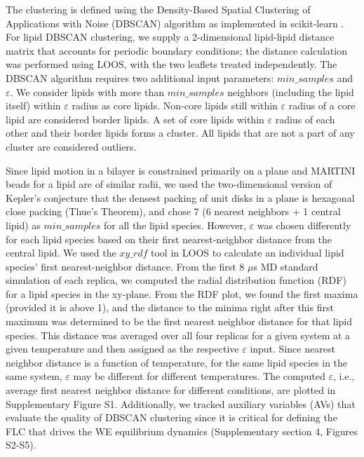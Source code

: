 \documentclass{biophys-new}
\begin{document}
The clustering is defined using the Density-Based Spatial Clustering of Applications with Noise (DBSCAN) algorithm \cite{MartinEsterHans-PeterKriegelJiirgSander1996, Ester2017} as implemented in scikit-learn \cite{PedregosaF.VaroquauxG.GramfortA.MichelV.ThirionB.GriselO.BlondelM.PrettenhoferP.WeissR.andDubourgV.VanderplasJ.PassosA.CournapeauD.BrucherM.PerrotM.Duchesnay2011}.
For lipid DBSCAN clustering, we supply a 2-dimensional lipid-lipid distance matrix that accounts for periodic boundary conditions; the distance calculation was performed using LOOS, with the two leaflets treated independently.
The DBSCAN algorithm requires two additional input parameters: $min\_samples$ and $\varepsilon$.
We consider lipids with more than $min\_samples$ neighbors (including the lipid itself) within $\varepsilon$ radius as core lipids.
Non-core lipids still within $\varepsilon$ radius of a core lipid are considered border lipids.
A set of core lipids within $\varepsilon$ radius of each other and their border lipids forms a cluster.
All lipids that are not a part of any cluster are considered outliers.

Since lipid motion in a bilayer is constrained primarily on a plane and MARTINI beads for a lipid are of similar radii, we used the two-dimensional version of Kepler's conjecture that the densest packing of unit disks in a plane is hexagonal close packing (Thue's Theorem), and
chose 7 (6 nearest neighbors + 1 central lipid) as $min\_samples$ for all the lipid species.
However, $\varepsilon$ was chosen differently for each lipid species based on their first nearest-neighbor distance from the central lipid.
We used the $xy\_rdf$ tool in LOOS to calculate an individual lipid species' first nearest-neighbor distance.
From the first 8 $\mu$s MD standard simulation of each replica, we computed the radial distribution function (RDF) for a lipid species in the xy-plane.
From the RDF plot, we found the first maxima (provided it is above 1), and the distance to the minima right after this first maximum was determined to be the first nearest neighbor distance for that lipid species.
This distance was averaged over all four replicas for a given system at a given temperature and then assigned as the respective $\varepsilon$ input.
Since nearest neighbor distance is a function of temperature, for the same lipid species in the same system, $\varepsilon$ may be different for different temperatures.
The computed $\varepsilon$, i.e., average first nearest neighbor distance for different conditions, are plotted in Supplementary Figure S1.
Additionally, we tracked auxiliary variables (AVs) that evaluate the quality of DBSCAN clustering since it is critical for defining the FLC that drives the WE equilibrium dynamics (Supplementary section 4, Figures S2-S5).
\end{document}
